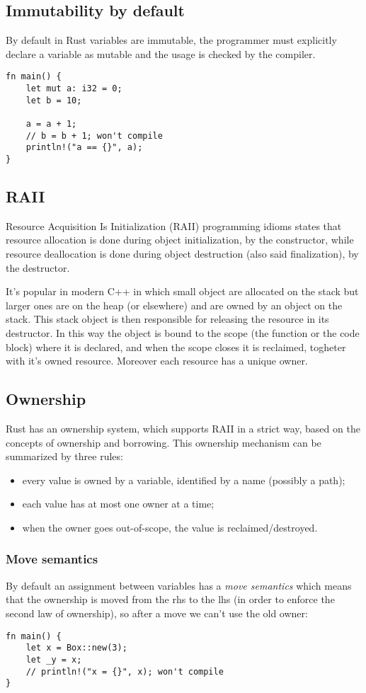 \subsection{Immutability by default}
By default in Rust variables are immutable, the programmer must explicitly declare a variable as mutable and the usage is checked by the compiler.
\begin{verbatim}
fn main() {
    let mut a: i32 = 0;
    let b = 10;

    a = a + 1;
    // b = b + 1; won't compile
    println!("a == {}", a);
}
\end{verbatim}

\subsection{RAII}
Resource Acquisition Is Initialization (RAII) programming idioms states that resource allocation is done during object initialization, by the constructor, while resource deallocation is done during object destruction (also said finalization), by the destructor.

It's popular in modern C++ in which small object are allocated on the stack but larger ones are on the heap (or elsewhere) and are owned by an object on the stack.
This stack object is then responsible for releasing the resource in its destructor.
In this way the object is bound to the scope (the function or the code block) where it is declared, and when the scope closes it is reclaimed, togheter with it's owned resource.
Moreover each resource has a unique owner.

\subsection{Ownership}
Rust has an ownership system, which supports RAII in a strict way, based on the concepts of ownership and borrowing.
This ownership mechanism can be summarized by three rules:
\begin{itemize}
    \item every value is owned by a variable, identified by a name (possibly a path);
    \item each value has at most one owner at a time;
    \item when the owner goes out-of-scope, the value is reclaimed/destroyed.
\end{itemize}

\subsubsection{Move semantics}
By default an assignment between variables has a \emph{move semantics} which means that the ownership is moved from the rhs to the lhs (in order to enforce the second law of ownership), so after a move we can't use the old owner:
\begin{verbatim}
fn main() {
    let x = Box::new(3);
    let _y = x;
    // println!("x = {}", x); won't compile
}
\end{verbatim}

